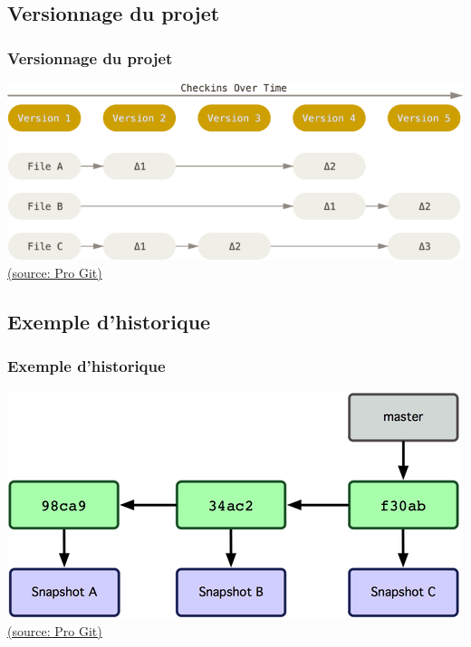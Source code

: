 \documentclass[t,11pt]{beamer}
\begin{document}
\subsection{Versionnage du projet}
\begin{frame}[c]
        \frametitle{Versionnage du projet}
        \includegraphics[width=\linewidth]{./img/deltas}
        \newline
        \hspace*{15pt}
        \href{https://git-scm.com/book/fr/v2/D\%C3\%A9marrage-rapide-Rudiments-de-Git}{{\tiny (source: Pro Git)}}
\end{frame}



\subsection{Exemple d'historique}
\begin{frame}[c]
        \frametitle{Exemple d'historique}
        \includegraphics[width=\linewidth]{./img/master_branch}
        \newline
        \hspace*{15pt}
        \href{https://git-scm.com/book/fr/v1/Les-branches-avec-Git-Ce-qu-est-une-branche}{{\tiny (source: Pro Git)}}
\end{frame}
\end{document}
